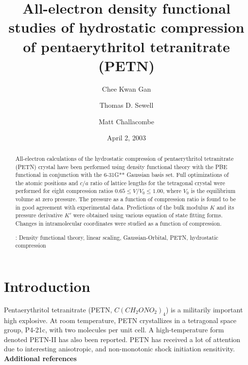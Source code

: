 \documentclass[prb,aps,nobibnotes,twocolumn,doublespace,twocolumngrid,superbib]{revtex4}
\begin{document}
\title[Short Title]{ 
All-electron density functional studies of hydrostatic compression of 
pentaerythritol tetranitrate (PETN) }
\author{Chee Kwan Gan\footnotemark[1]}
\author{Thomas D. Sewell\footnotemark[2]}
\author{Matt Challacombe\footnotemark[3]}

\date{April 2, 2003}

\begin{abstract}
All-electron calculations of the hydrostatic compression of
pentaerythritol tetranitrate (PETN) crystal have been performed using
density functional theory with the PBE functional in
conjunction with the 6-31G** Gaussian basis set.  Full optimizations
of the atomic positions and $c/a$ ratio of lattice lengths for the 
tetragonal crystal were performed for eight compression ratios $0.65 
\le V/V_0 \le 1.00$, where $V_0$ is the equilibrium volume at zero
pressure.  The pressure as a function of compression ratio
is found to be in good agreement with experimental data.  Predictions
of the bulk modulus $K$ and its pressure derivative $K'$ were obtained
using various equation of state fitting forms. Changes in intramolecular 
coordinates were studied as a function of compression.



\smallskip
{}: Density functional theory, linear scaling, 
Gaussian-Orbital, PETN, hydrostatic compression
\end{abstract}


\maketitle


\section{Introduction}
Pentaerythritol tetranitrate (PETN, $C(CH_2ONO_2)_4$) is a militarily 
important high explosive.  At room temperature, PETN crystallizes in a 
tetragonal space group, P4-21c,  %
with two molecules per unit
cell\cite{Trotter_1963v16,Conant_1970}.
A high-temperature 
form denoted PETN-II has also been reported\cite{Cady_1975vB41}.  
PETN has received a lot of attention due to interesting anisotropic, 
and non-monotonic shock initiation sensitivity. {\bf Additional references}
\end{document}

